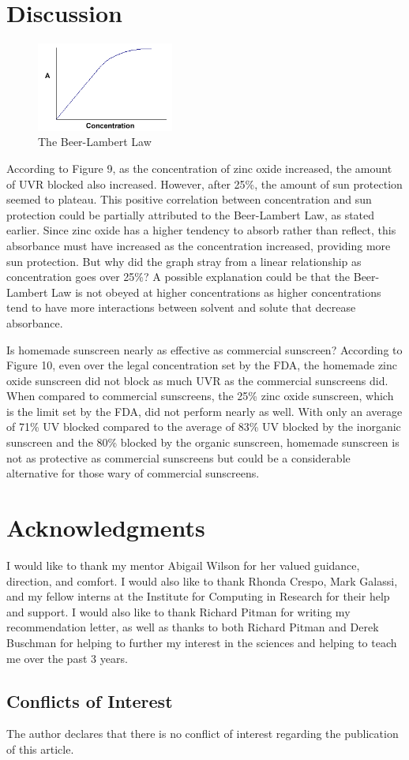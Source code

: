\documentclass{article}
\begin{document}
\section{Discussion}
\begin{figure}
  \centering
  \caption{The Beer-Lambert Law \cite{noauthor_beers_nodate}}
  \includegraphics[width=0.4\textwidth]{BLCurve.png}
\end{figure}
According to Figure 9, as the concentration of zinc oxide increased, the amount of UVR blocked also increased. However, after 25\%, the amount of sun protection seemed to plateau. This positive correlation between concentration and sun protection could be partially attributed to the Beer-Lambert Law, as stated earlier. Since zinc oxide has a higher tendency to absorb rather than reflect, this absorbance must have increased as the concentration increased, providing more sun protection. But why did the graph stray from a linear relationship as concentration goes over 25\%? A possible explanation could be that the Beer-Lambert Law is not obeyed at higher concentrations as higher concentrations tend to have more interactions between solvent and solute that decrease absorbance.

Is homemade sunscreen nearly as effective as commercial sunscreen? According to Figure 10, even over the legal concentration set by the FDA, the homemade zinc oxide sunscreen did not block as much UVR as the commercial sunscreens did. When compared to commercial sunscreens, the 25\% zinc oxide sunscreen, which is the limit set by the FDA, did not perform nearly as well. With only an average of 71\% UV blocked compared to the average of 83\% UV blocked by the inorganic sunscreen and the 80\% blocked by the organic sunscreen, homemade sunscreen is not as protective as commercial sunscreens but could be a considerable alternative for those wary of commercial sunscreens.


\section{Acknowledgments}
I would like to thank my mentor Abigail Wilson for her valued guidance, direction, and comfort. I would also like to thank Rhonda Crespo, Mark Galassi, and my fellow interns at the Institute for Computing in Research for their help and support. I would also like to thank Richard Pitman for writing my recommendation letter, as well as thanks to both Richard Pitman and Derek Buschman for helping to further my interest in the sciences and helping to teach me over the past 3 years.

\subsection{Conflicts of Interest}
The author declares that there is no conflict of interest regarding the publication of this article.

\newpage
\printbibliography
\end{document}

